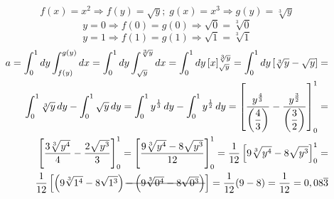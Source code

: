 \begin{enumerate}
	\begin{equation*}
		f(x) = x^2 \Rightarrow f(y) = \sqrt{y};\; g(x) = x^3 \Rightarrow g(y) = \sqrt[3]{y}
	\end{equation*}
	\begin{equation*}
		y = 0 \Rightarrow f(0) = g(0) \Rightarrow \sqrt{0} = \sqrt[3]{0}
	\end{equation*}
	\begin{equation*}
		y = 1 \Rightarrow f(1) = g(1) \Rightarrow \sqrt{1} = \sqrt[3]{1}
	\end{equation*}
	\begin{align*}
		a = \int_0^1 dy \int_{f(y)}^{g(y)} dx = \int_0^1 dy \int_{\sqrt{y}}^{\sqrt[3]{y}} dx = \int_0^1 dy\, [x]_{\sqrt{y}}^{\sqrt[3]{y}} = \int_0^1 dy \left[\sqrt[3]{y} - \sqrt{y}\right] =\\ \int_0^1 \sqrt[3]{y}\, dy - \int_0^1 \sqrt{y}\, dy = \int_0^1 y^{\frac{1}{3}}\, dy - \int_0^1 y^{\frac{1}{2}}\, dy = \left[\dfrac{y^{\frac{4}{3}}}{\left(\dfrac{4}{3}\right)} - \dfrac{y^{\frac{3}{2}}}{\left(\dfrac{3}{2}\right)}\right]_0^1 =\\ \left[\dfrac{3 \sqrt[3]{y^4}}{4} - \dfrac{2 \sqrt{y^3}}{3}\right]_0^1 = \left[\dfrac{9 \sqrt[3]{y^4} - 8 \sqrt{y^3}}{12}\right]_0^1 = \dfrac{1}{12}\left[9 \sqrt[3]{y^4} - 8 \sqrt{y^3}\right]_0^1 =\\ \dfrac{1}{12}\left[\left(9 \sqrt[3]{1^4} - 8 \sqrt{1^3}\right) \overstrike{-\left(9 \sqrt[3]{0^4} - 8 \sqrt{0^3}\right)}\right] = \dfrac{1}{12}(9 - 8) = \dfrac{1}{12} = 0,08\overline{3}
	\end{align*}
\end{enumerate}